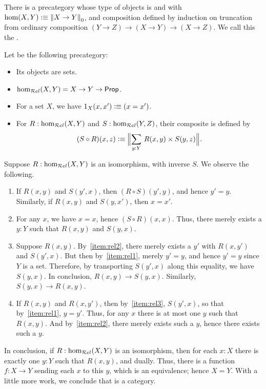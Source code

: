 \begin{eg}\label{ct:hoprecat}
  There is a precategory whose type of objects is \type and with $\hom(X,Y) \vcentcolon\equiv \mathopen{}\left\Vert X\to Y\right\Vert_{0}\mathclose{}$, and composition defined by induction on truncation from ordinary composition $(Y\to Z) \to (X\to Y) \to (X\to Z)$.
  We call this the .
\end{eg}

\begin{eg}\label{ct:rel}
  Let \urel be the following precategory:
  \begin{itemize}
  \item Its objects are sets.
  \item $\hom_{\mathcal{R}el}(X,Y) = X\to Y\to \mathsf{Prop}$.
  \item For a set $X$, we have $1_X(x,x') \vcentcolon\equiv (x=x')$.
  \item For $R:\hom_{\mathcal{R}el}(X,Y)$ and $S:\hom_{\mathcal{R}el}(Y,Z)$, their composite is defined by
    \[ (S\circ R)(x,z) \defeq \Brck{\sm{y:Y} R(x,y) \times S(y,z)}.\]
  \end{itemize}
  Suppose $R:\hom_{\mathcal{R}el}(X,Y)$ is an isomorphism, with inverse $S$.
  We observe the following.
  \begin{enumerate}
  \item If $R(x,y)$ and $S(y',x)$, then $(R\circ S)(y',y)$, and hence $y'=y$.
    Similarly, if $R(x,y)$ and $S(y,x')$, then $x=x'$.\label{item:rel1}
  \item For any $x$, we have $x=x$, hence $(S\circ R)(x,x)$.
    Thus, there merely exists a $y:Y$ such that $R(x,y)$ and $S(y,x)$.\label{item:rel2}
  \item Suppose $R(x,y)$.
    By~\ref{item:rel2}, there merely exists a $y'$ with $R(x,y')$ and $S(y',x)$.
    But then by~\ref{item:rel1}, merely $y'=y$, and hence $y'=y$ since $Y$ is a set.
    Therefore, by transporting $S(y',x)$ along this equality, we have $S(y,x)$.
    In conclusion, $R(x,y)\to S(y,x)$.
    Similarly, $S(y,x) \to R(x,y)$.\label{item:rel3}
  \item If $R(x,y)$ and $R(x,y')$, then by~\ref{item:rel3}, $S(y',x)$, so that by~\ref{item:rel1}, $y=y'$.
    Thus, for any $x$ there is at most one $y$ such that $R(x,y)$.
    And by~\ref{item:rel2}, there merely exists such a $y$, hence there exists such a $y$.
  \end{enumerate}
  In conclusion, if $R:\hom_{\mathcal{R}el}(X,Y)$ is an isomorphism, then for each $x:X$ there is exactly one $y:Y$ such that $R(x,y)$, and dually.
  Thus, there is a function $f:X\to Y$ sending each $x$ to this $y$, which is an equivalence; hence $X=Y$.
  With a little more work, we conclude that \urel is a category.
\end{eg}

